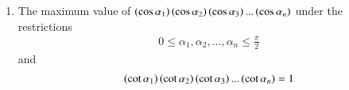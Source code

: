 \documentclass[journal,12pt,twocolumn]{IEEEtran}
\theoremstyle{remark}
\begin{document}
\begin{enumerate}
    \item The maximum value of $\left(\cos{\alpha_1}\right)\left(\cos{\alpha_2}\right)\left(\cos{\alpha_3}\right)...\left(\cos{\alpha_n}\right)$ under the restrictions
   	\begin{align} 
		0\le\alpha_1,\alpha_2,...,\alpha_n\le\frac{\pi}{2}
	\end {align} and 
	\begin{align}
		\left(\cot{\alpha_1}\right)\left(\cot{\alpha_2}\right)\left(\cot{\alpha_3}\right)...\left(\cot{\alpha_n}\right) = 1
	\end{align}
        \hfill{}
        \begin{enumerate}[label={(\alph*)}]
        \end{enumerate}
\end{enumerate}
\end{document}
